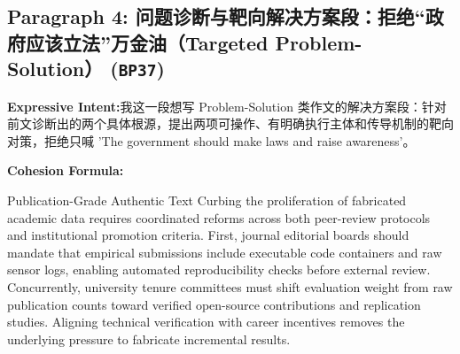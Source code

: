 \subsection*{Paragraph 4: 问题诊断与靶向解决方案段：拒绝“政府应该立法”万金油（Targeted Problem-Solution） (\texttt{BP37})}
\noindent\textbf{Expressive Intent:}\enspace 我这一段想写 Problem-Solution 类作文的解决方案段：针对前文诊断出的两个具体根源，提出两项可操作、有明确执行主体和传导机制的靶向对策，拒绝只喊 'The government should make laws and raise awareness'。\par
\noindent\textbf{Cohesion Formula:}\par\vspace{4pt}
\begin{ExampleBox}{Publication-Grade Authentic Text}
Curbing the proliferation of fabricated academic data requires coordinated reforms across both peer-review protocols and institutional promotion criteria. First, journal editorial boards should mandate that empirical submissions include executable code containers and raw sensor logs, enabling automated reproducibility checks before external review. Concurrently, university tenure committees must shift evaluation weight from raw publication counts toward verified open-source contributions and replication studies. Aligning technical verification with career incentives removes the underlying pressure to fabricate incremental results.
\end{ExampleBox}
